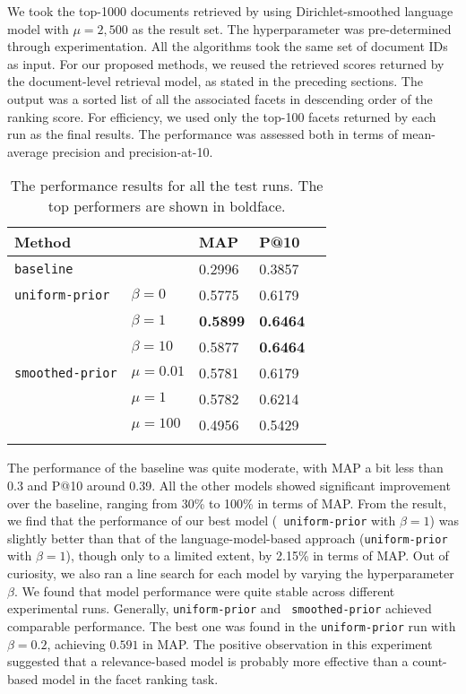 We took the top-1000 documents retrieved by using Dirichlet-smoothed language
model with $\mu = 2,500$ as the result set.  The hyperparameter was
pre-determined through experimentation.  All the algorithms took the same set
of document IDs as input.  For our proposed methods, we reused the retrieved
scores returned by the document-level retrieval model, as stated in the
preceding sections.  The output was a sorted list of all the associated facets
in descending order of the ranking score.  For efficiency, we used only the
top-100 facets returned by each run as the final results.  The performance was
assessed both in terms of mean-average precision and precision-at-10.

\begin{table}[ht!]
  \centering
  \begin{tabular}{lllll}
    Method & & MAP & P@10 & \\
    \hline
    {\tt baseline} & & 0.2996 & 0.3857 & \\
    {\tt uniform-prior} & $\beta = 0$ \cite{balog2009language} & 0.5775 & 0.6179 & \\
    & $\beta = 1$ & {\bf 0.5899} & {\bf 0.6464} & \\
    & $\beta = 10$ & 0.5877 & {\bf 0.6464} & \\
    {\tt smoothed-prior} & $\mu = 0.01$ & 0.5781 & 0.6179 &\\
    & $\mu = 1$ & 0.5782 & 0.6214 & \\
    & $\mu = 100$ & 0.4956 & 0.5429 & \\
    \\
  \end{tabular}
  \caption{The performance results for all the test runs.  The top performers are
  shown in boldface.} \label{t:performance}
\end{table}

The performance of the baseline was quite moderate, with MAP a bit less
than 0.3 and P@10 around 0.39.  All the other models showed significant
improvement over the baseline, ranging from 30\% to 100\% in terms of MAP.
From the result, we find that the performance of our best model ({\tt
uniform-prior} with $\beta = 1$) was slightly better than that of the
language-model-based approach \cite{balog2009language} ({\tt uniform-prior}
with $\beta = 1$), though only to a limited extent, by 2.15\% in terms of MAP.
Out of curiosity, we also ran a line search for each model by varying the
hyperparameter $\beta$.  We found that model performance were quite stable
across different experimental runs.  Generally, {\tt uniform-prior} and {\tt
smoothed-prior} achieved comparable performance.  The best one was found in the
{\tt uniform-prior} run with $\beta = 0.2$, achieving $0.591$ in MAP.  The
positive observation in this experiment suggested that a relevance-based
model is probably more effective than a count-based model in the
facet ranking task.  

